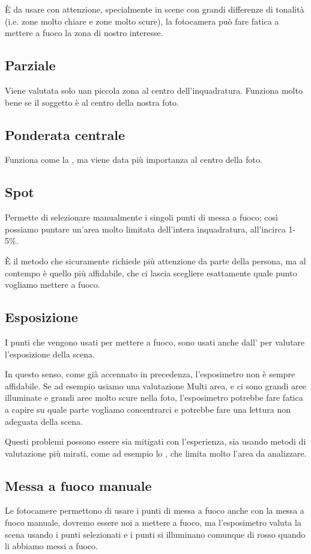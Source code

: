 È da usare con attenzione, specialmente in scene con grandi differenze di tonalità (i.e. zone molto chiare e zone molto scure), la fotocamera può fare fatica a mettere a fuoco la zona di nostro interesse.


\subsection{Parziale} \label{subsec:parziale}
Viene valutata solo uan piccola zona al centro dell'inquadratura. Funziona molto bene se il soggetto è al centro della nostra foto.

\subsection{Ponderata centrale} \label{subsec:ponderata}
Funziona come la , ma viene data più importanza al centro della foto.

\subsection{Spot} \label{subsec:spot}
Permette di selezionare manualmente i singoli punti di messa a fuoco; così possiamo puntare un'area molto limitata dell'intera inquadratura, all'incirca 1-5\%.

È il metodo che sicuramente richiede più attenzione da parte della persona, ma al contempo è quello più affidabile, che ci lascia scegliere esattamente quale punto vogliamo mettere a fuoco.


\subsection{Esposizione} \label{subsec:messafuocoesposizione}
I punti che vengono usati per mettere a fuoco, sono usati anche dall' per valutare l'esposizione della scena.

In questo senso, come già accennato in precedenza, l'esposimetro non è sempre affidabile. Se ad esempio usiamo una valutazione Multi area, e ci sono grandi aree illuminate e grandi aree molto scure nella foto, l'esposimetro potrebbe fare fatica a capire su quale parte vogliamo concentrarci e potrebbe fare una lettura non adeguata della scena.

Questi problemi possono essere sia mitigati con l'esperienza, sia usando metodi di valutazione più mirati, come ad esempio lo , che limita molto l'area da analizzare.


\subsection{Messa a fuoco manuale} \label{subsec:puntifuocomanuale}
Le fotocamere permettono di usare i punti di messa a fuoco anche con la messa a fuoco manuale, dovremo essere noi a mettere a fuoco, ma l'esposimetro valuta la scena usando i punti selezionati e i punti si illuminano comunque di rosso quando li abbiamo messi a fuoco.